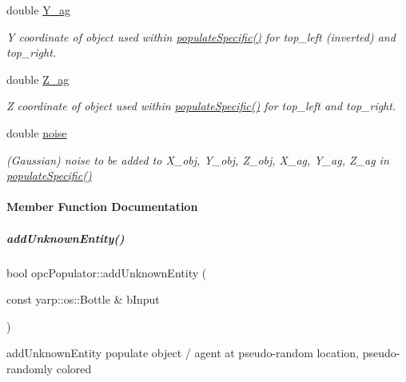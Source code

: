 \begin{DoxyCompactItemize}
double \hyperlink{group__opcPopulator_a1128329503e3c50b59dc0ad5f43a5719}{Y\+\_\+ag}
\begin{DoxyCompactList}\small\item\em Y coordinate of object used within \hyperlink{group__opcPopulator_a0fba845edd63a15da94b864022d20ba3}{populate\+Specific()} for top\+\_\+left (inverted) and top\+\_\+right. \end{DoxyCompactList}\item 
double \hyperlink{group__opcPopulator_a7538dcad96e0b3be0a930f3f85ab0708}{Z\+\_\+ag}
\begin{DoxyCompactList}\small\item\em Z coordinate of object used within \hyperlink{group__opcPopulator_a0fba845edd63a15da94b864022d20ba3}{populate\+Specific()} for top\+\_\+left and top\+\_\+right. \end{DoxyCompactList}\item 
double \hyperlink{group__opcPopulator_aeffb7a10bda618b48f14298b671eec2d}{noise}
\begin{DoxyCompactList}\small\item\em (Gaussian) noise to be added to X\+\_\+obj, Y\+\_\+obj, Z\+\_\+obj, X\+\_\+ag, Y\+\_\+ag, Z\+\_\+ag in \hyperlink{group__opcPopulator_a0fba845edd63a15da94b864022d20ba3}{populate\+Specific()} \end{DoxyCompactList}\end{DoxyCompactItemize}


\paragraph{Member Function Documentation}
\mbox{\label{group__opcPopulator_a85dcb08eeb5dd99770190dc06abfcef1}} 
\subparagraph{\texorpdfstring{add\+Unknown\+Entity()}{addUnknownEntity()}}
{\footnotesize\ttfamily bool opc\+Populator\+::add\+Unknown\+Entity (\begin{DoxyParamCaption}\item[{const yarp\+::os\+::\+Bottle \&}]{b\+Input }\end{DoxyParamCaption})}



add\+Unknown\+Entity populate object / agent at pseudo-\/random location, pseudo-\/randomly colored 


